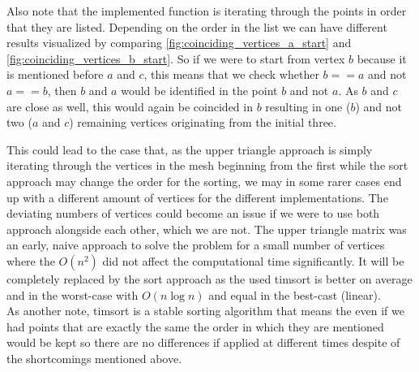 Also note that the implemented function is iterating through the points in order that they are listed. Depending on the order in the list we can have different results visualized by comparing \autoref{fig:coinciding_vertices_a_start} and \autoref{fig:coinciding_vertices_b_start}. So if we were to start from vertex $b$ because it is mentioned before $a$ and $c$, this means that we check whether $b == a$ and not $a == b$, then $b$ and $a$ would be identified in the point $b$ and not $a$. As $b$ and $c$ are close as well, this would again be coincided in $b$ resulting in one ($b$) and not two ($a$ and $c$) remaining vertices originating from the initial three.

This could lead to the case that, as the upper triangle approach is simply iterating through the vertices in the mesh beginning from the first while the sort approach may change the order for the sorting, we may in some rarer cases end up with a different amount of vertices for the different implementations. The deviating numbers of vertices could become an issue if we were to use both approach alongside each other, which we are not. The upper triangle matrix was an early, naive approach to solve the problem for a small number of vertices where the $O(n^2)$ did not affect the computational time significantly. It will be completely replaced by the sort approach as the used timsort is better on average and in the worst-case with $O(n\log n)$ and equal in the best-cast (linear).\\

As another note, timsort is a stable sorting algorithm that means the even if we had points that are exactly the same the order in which they are mentioned would be kept so there are no differences if applied at different times despite of the shortcomings mentioned above.